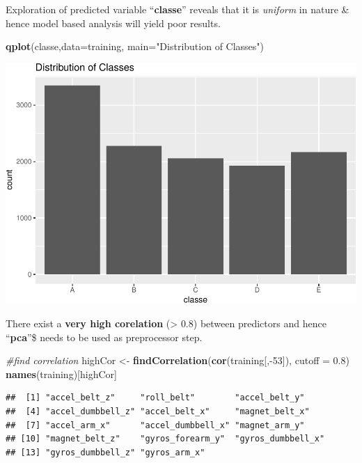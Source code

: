 \documentclass[]{article}
\newenvironment{Shaded}{\begin{snugshade}}{\end{snugshade}}
\newcommand{\KeywordTok}[1]{\textcolor[rgb]{0.13,0.29,0.53}{\textbf{{#1}}}}
\newcommand{\DataTypeTok}[1]{\textcolor[rgb]{0.13,0.29,0.53}{{#1}}}
\newcommand{\DecValTok}[1]{\textcolor[rgb]{0.00,0.00,0.81}{{#1}}}
\newcommand{\FloatTok}[1]{\textcolor[rgb]{0.00,0.00,0.81}{{#1}}}
\newcommand{\StringTok}[1]{\textcolor[rgb]{0.31,0.60,0.02}{{#1}}}
\newcommand{\CommentTok}[1]{\textcolor[rgb]{0.56,0.35,0.01}{\textit{{#1}}}}
\newcommand{\NormalTok}[1]{{#1}}
\begin{document}
Exploration of predicted variable ``\textbf{classe}'' reveals that it is
\emph{uniform} in nature \& hence model based analysis will yield poor
results.

\begin{Shaded}
\begin{Highlighting}[]
\KeywordTok{qplot}\NormalTok{(classe,}\DataTypeTok{data=}\NormalTok{training, }\DataTypeTok{main=}\StringTok{"Distribution of Classes"}\NormalTok{)}
\end{Highlighting}
\end{Shaded}

\includegraphics{index_files/figure-latex/unnamed-chunk-6-1.pdf}

There exist a \textbf{very high corelation} (\textgreater{} \(0.8\))
between predictors and hence ``\textbf{pca}''\$ needs to be used as
preprocessor step.

\begin{Shaded}
\begin{Highlighting}[]
\CommentTok{#find correlation}
\NormalTok{highCor <-}\StringTok{ }\KeywordTok{findCorrelation}\NormalTok{(}\KeywordTok{cor}\NormalTok{(training[,-}\DecValTok{53}\NormalTok{]), }\DataTypeTok{cutoff =} \FloatTok{0.8}\NormalTok{)}
\KeywordTok{names}\NormalTok{(training)[highCor]}
\end{Highlighting}
\end{Shaded}

\begin{verbatim}
##  [1] "accel_belt_z"     "roll_belt"        "accel_belt_y"    
##  [4] "accel_dumbbell_z" "accel_belt_x"     "magnet_belt_x"   
##  [7] "accel_arm_x"      "accel_dumbbell_x" "magnet_arm_y"    
## [10] "magnet_belt_z"    "gyros_forearm_y"  "gyros_dumbbell_x"
## [13] "gyros_dumbbell_z" "gyros_arm_x"
\end{verbatim}
\end{document}

